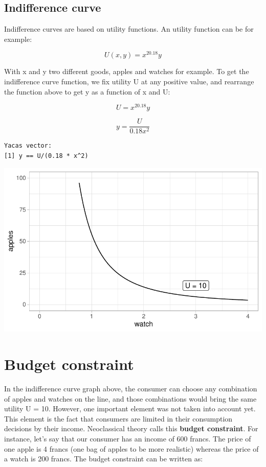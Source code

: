 \documentclass[
  letterpaper,
  DIV=11,
  numbers=noendperiod]{scrreprt}
\begin{document}
\hypertarget{indifference-curve}{%
\subsection{Indifference curve}\label{indifference-curve}}

Indifference curves are based on utility functions. An utility function
can be for example:

\[U(x,y)=x^20.18y\]

With x and y two different goods, apples and watches for example. To get
the indifference curve function, we fix utility U at any positive value,
and rearrange the function above to get y as a function of x and U:

\[U = x^20.18y\]

\[y = \frac{U}{0.18x^2}\]

\begin{verbatim}
Yacas vector:
[1] y == U/(0.18 * x^2)
\end{verbatim}

\includegraphics{consumer-theory_files/figure-pdf/unnamed-chunk-7-1.pdf}

\hypertarget{budget-constraint}{%
\section{Budget constraint}\label{budget-constraint}}

In the indifference curve graph above, the consumer can choose any
combination of apples and watches on the line, and those combinations
would bring the same utility U = 10. However, one important element was
not taken into account yet. This element is the fact that consumers are
limited in their consumption decisions by their income. Neoclassical
theory calls this \textbf{budget constraint}. For instance, let's say
that our consumer has an income of 600 francs. The price of one apple is
4 francs (one bag of apples to be more realistic) whereas the price of a
watch is 200 francs. The budget constraint can be written as:
\end{document}
